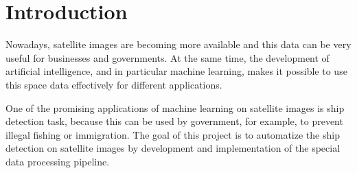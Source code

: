 \section{Introduction}

Nowadays, satellite images are becoming more available and this data can be very useful for businesses and governments. At the same time, the development of artificial intelligence, and in particular machine learning, makes it possible to use this space data effectively for different applications. 

One of the promising applications of machine learning on satellite images is ship detection task, because this can be used by government, for example, to prevent illegal fishing or immigration. The goal of this project is to automatize the ship detection on satellite images by development and implementation of the special data processing pipeline.

